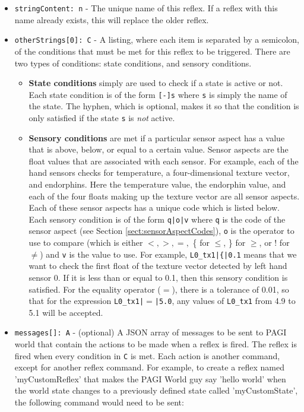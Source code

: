 \begin{itemize}
\item \texttt{stringContent: n} - The unique name of this reflex. If a reflex with this name already exists, this will replace the older reflex.
\item \texttt{otherStrings[0]: C} - A listing, where each item is separated by a semicolon, of the conditions that must be met for this reflex to be triggered. There are two types of conditions: state conditions, and sensory conditions. 
	\begin{itemize}
	\item \textbf{State conditions} simply are used to check if a state is active or not. Each state condition is of the form \texttt{[-]s} where \texttt{s} is simply the name of the state. The hyphen, which is optional, makes it so that the condition is only satisfied if the state \texttt{s} is \textit{not} active.
	\item \textbf{Sensory conditions} are met if a particular sensor aspect has a value that is above, below, or equal to a certain value. Sensor aspects are the float values that are associated with each sensor. For example, each of the hand sensors checks for temperature, a four-dimensional texture vector, and endorphins. Here the temperature value, the endorphin value, and each of the four floats making up the texture vector are all sensor aspects. Each of these sensor aspects has a unique code which is listed below.\\
	Each sensory condition is of the form \texttt{q|o|v} where \texttt{q} is the code of the sensor aspect (see Section \ref{sect:sensorAspectCodes}), \texttt{o} is the operator to use to compare (which is either $<, >, =,$ \{ for $\leq$, \} for $\geq$, or ! for $\neq$) and \texttt{v} is the value to use. For example, \texttt{L0\_tx1|\{|0.1} means that we want to check the first float of the texture vector detected by left hand sensor 0. If it is less than or equal to 0.1, then this sensory condition is satisfied. For the equality operator ($=$), there is a tolerance of 0.01, so that for the expression \texttt{L0\_tx1|$=$|5.0}, any values of \texttt{L0\_tx1} from 4.9 to 5.1 will be accepted.
	\end{itemize}
\item \texttt{messages[]: A} - (optional) A JSON array of messages to be sent to PAGI world that contain the actions to be made when a reflex is fired. The reflex is fired when every condition in \texttt{C} is met. Each action is another command, except for another reflex command. For example, to create a reflex named 'myCustomReflex' that makes the PAGI World guy say 'hello world' when the world state changes to a previously defined state called 'myCustomState', the following command would need to be sent:


\end{itemize}
